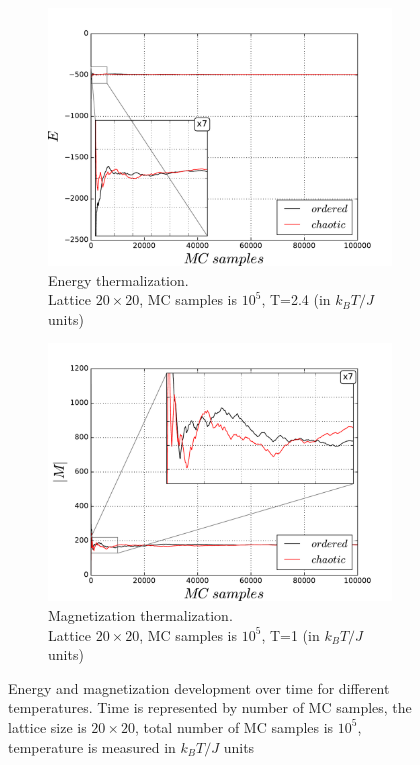\documentclass[a4paper]{article}
\begin{document}
\begin{figure}[h!]
\begin{subfigure}[b]{0.5\linewidth}
    \label{fig1:b} 
    \vspace{1ex}
  \end{subfigure} 
  \begin{subfigure}[b]{0.5\linewidth}
    \centering
    \includegraphics[width=1.0\linewidth]{20x20_10_5_24_energy} 
    \caption{Energy thermalization. \\ Lattice $20 \times 20$, MC samples is $10^5$, T=2.4 (in $k_BT/J$ units)} 
    \label{fig1:c} 
  \end{subfigure}
  \begin{subfigure}[b]{0.5\linewidth}
    \centering
    \includegraphics[width=1.0\linewidth]{20x20_10_5_24_magnet} 
    \caption{Magnetization thermalization. \\ Lattice $20 \times 20$, MC samples is $10^5$, T=1 (in $k_BT/J$ units)} 
    \label{fig1:d} 
  \end{subfigure} 
  \caption{ Energy and magnetization development over time for different temperatures. Time is represented by number of MC samples, the lattice size is $20 \times 20$, total number of MC samples is $10^5$, temperature is measured in $k_BT/J$ units }
  \label{fig1} 
\end{figure}
\end{document}
